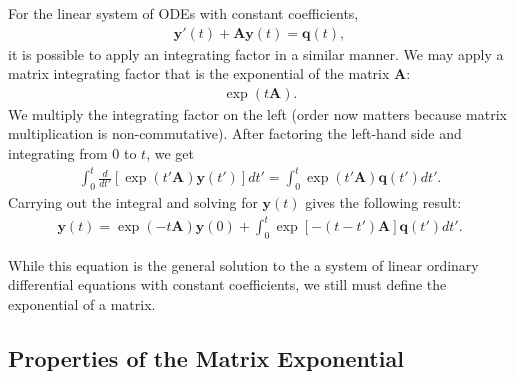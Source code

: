 For the linear system of ODEs with constant coefficients,
\begin{align}
  \mathbf{y}'(t) + \mathbf{A} \mathbf{y}(t) = \mathbf{q}(t),
\end{align}
it is possible to apply an integrating factor in a similar manner. We may apply a matrix integrating factor that is the exponential of the matrix $\mathbf{A}$:
\begin{align}
  \exp \left( t \mathbf{A} \right).
\end{align}
We multiply the integrating factor on the left (order now matters because matrix multiplication is non-commutative). After factoring the left-hand side and integrating from 0 to $t$, we get
\begin{align}
  \int_0^t \frac{d}{dt'} \left[ \exp \left( t '\mathbf{A} \right) \mathbf{y}(t')  \right] dt' = \int_0^t  \exp \left( t' \mathbf{A} \right) \mathbf{q}(t') dt'. \nonumber
\end{align}
Carrying out the integral and solving for $\mathbf{y}(t)$ gives the following result:
\begin{align}
   \mathbf{y}(t)  = \exp \left( -t \mathbf{A} \right) \mathbf{y}(0) + \int_0^t  \exp \left[ -( t - t' ) \mathbf{A} \right] \mathbf{q}(t') dt'.
\end{align}

While this equation is the general solution to the a system of linear ordinary differential equations with constant coefficients, we still must define the exponential of a matrix.

\subsection{Properties of the Matrix Exponential}

